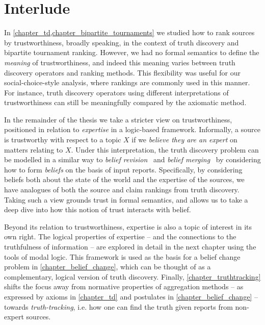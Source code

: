 \chapter*{Interlude}

In \cref{chapter_td,chapter_bipartite_tournaments} we studied how to rank
sources by trustworthiness, broadly speaking, in the context of truth discovery
and bipartite tournament ranking. However, we had no formal semantics to define
the \emph{meaning} of trustworthiness, and indeed this meaning varies between
truth discovery operators and ranking methods. This flexibility was useful for
our social-choice-style analysis, where rankings are commonly used in this
manner. For instance, truth discovery operators using different interpretations
of trustworthiness can still be meaningfully compared by the axiomatic method.

In the remainder of the thesis we take a stricter view on trustworthiness,
positioned in relation to \emph{expertise} in a logic-based framework.
Informally, a source is trustworthy with respect to a topic $X$ if we
\emph{believe they are an expert} on matters relating to $X$. Under this
interpretation, the truth discovery problem can be modelled in a similar way to
\emph{belief revision}~\cite{alchourron1985logic} and \emph{belief
merging}~\cite{konieczny2002merging} by considering how to form \emph{beliefs}
on the basis of input reports. Specifically, by considering beliefs both about
the state of the world and the expertise of the sources, we have analogues of
both the source and claim rankings from truth discovery. Taking such a view
grounds trust in formal semantics, and allows us to take a deep dive into how
this notion of trust interacts with belief.

Beyond its relation to trustworthiness, expertise is also a topic of interest
in its own right. The logical properties of expertise -- and the connections to
the truthfulness of information -- are explored in detail in the next chapter
using the tools of modal logic. This framework is used as the basis for a
belief change problem in \cref{chapter_belief_change}, which can be thought of
as a complementary, logical version of truth discovery. Finally,
\cref{chapter_truthtracking} shifts the focus away from normative properties of
aggregation methods -- as expressed by axioms in \cref{chapter_td} and
postulates in \cref{chapter_belief_change} -- towards \emph{truth-tracking},
i.e. how one can find the truth given reports from non-expert sources.
